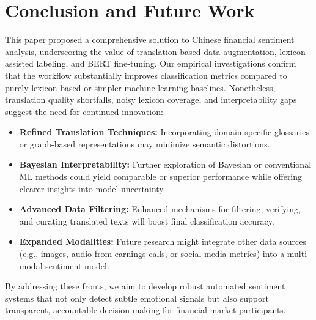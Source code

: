 \documentclass[12pt]{article}
\begin{document}
\section{Conclusion and Future Work}
\label{sec:conclusion}

This paper proposed a comprehensive solution to Chinese financial sentiment analysis, underscoring the value of translation-based data augmentation, lexicon-assisted labeling, and BERT fine-tuning. Our empirical investigations confirm that the workflow substantially improves classification metrics compared to purely lexicon-based or simpler machine learning baselines. Nonetheless, translation quality shortfalls, noisy lexicon coverage, and interpretability gaps suggest the need for continued innovation:

\begin{itemize}
    \item \textbf{Refined Translation Techniques:} Incorporating domain-specific glossaries or graph-based representations may minimize semantic distortions.
    \item \textbf{Bayesian Interpretability:} Further exploration of Bayesian or conventional ML methods could yield comparable or superior performance while offering clearer insights into model uncertainty.
    \item \textbf{Advanced Data Filtering:} Enhanced mechanisms for filtering, verifying, and curating translated texts will boost final classification accuracy.
    \item \textbf{Expanded Modalities:} Future research might integrate other data sources (e.g., images, audio from earnings calls, or social media metrics) into a multi-modal sentiment model.
\end{itemize}

By addressing these fronts, we aim to develop robust automated sentiment systems that not only detect subtle emotional signals but also support transparent, accountable decision-making for financial market participants.
\end{document}
